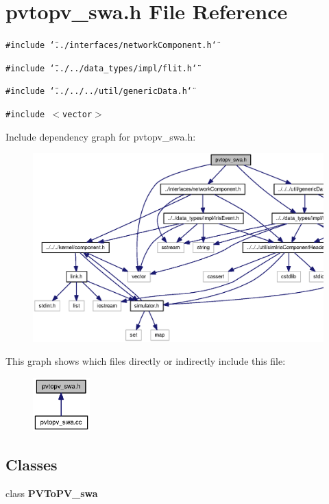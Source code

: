 \section{pvtopv\_\-swa.h File Reference}
\label{pvtopv__swa_8h}
{\tt \#include \char`\"{}../interfaces/networkComponent.h\char`\"{}}\par
{\tt \#include \char`\"{}../../data\_\-types/impl/flit.h\char`\"{}}\par
{\tt \#include \char`\"{}../../../util/genericData.h\char`\"{}}\par
{\tt \#include $<$vector$>$}\par


Include dependency graph for pvtopv\_\-swa.h:\nopagebreak
\begin{figure}[H]
\begin{center}
\leavevmode
\includegraphics[width=361pt]{pvtopv__swa_8h__incl}
\end{center}
\end{figure}


This graph shows which files directly or indirectly include this file:\nopagebreak
\begin{figure}[H]
\begin{center}
\leavevmode
\includegraphics[width=62pt]{pvtopv__swa_8h__dep__incl}
\end{center}
\end{figure}
\subsection*{Classes}
\begin{CompactItemize}
\item 
class {\bf PVToPV\_\-swa}
\end{CompactItemize}
